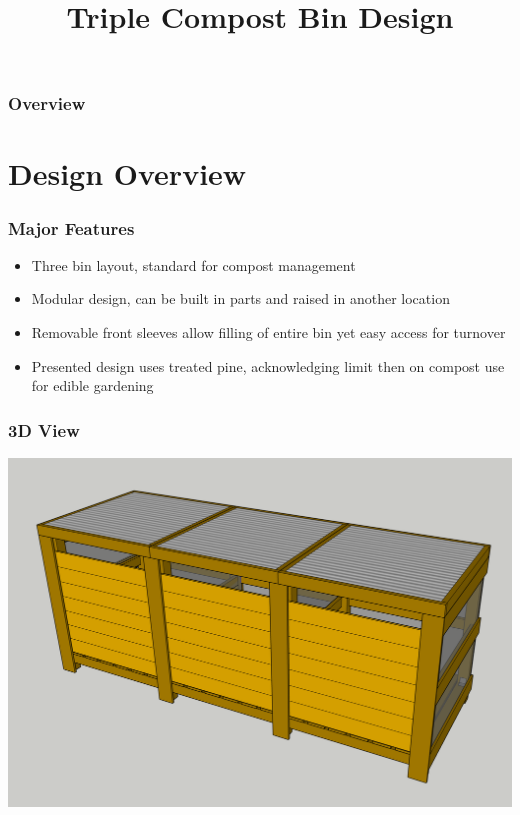 \documentclass{beamer}
\title[Compost Bins]{Triple Compost Bin Design}
\date{} %
\begin{document}
\begin{frame}
\titlepage %
\end{frame}

\begin{frame}
\frametitle{Overview} %
\tableofcontents %
\end{frame}


\section{Design Overview}

\begin{frame}
  \frametitle{Major Features}
  \begin{itemize}
    \item Three bin layout, standard for compost management
    \item Modular design, can be built in parts and raised in another location
    \item Removable front sleeves allow filling of entire bin yet easy access for turnover
    \item Presented design uses treated pine, acknowledging limit then on compost use for edible gardening
  \end{itemize}
\end{frame}

\begin{frame}
  \frametitle{3D View}
  \begin{center}
  \includegraphics[width=.85\textwidth]{images/FrontPanels.png}
  \end{center}
\end{frame}
\end{document}
